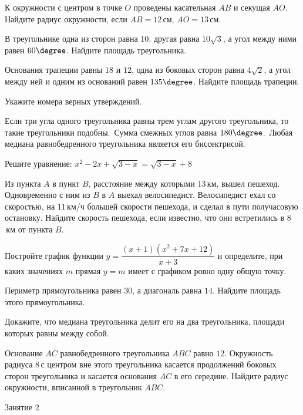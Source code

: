 \begin{class}[number=1]
\begin{listofex}
		\item К окружности с центром в точке \(O\) проведены касательная \(AB\) и секущая \(AO\). Найдите радиус окружности, если \(AB=12\) см, \(AO=13\) см.
		\item В треугольнике одна из сторон равна \(10\), другая равна \(10\sqrt{3}\), а угол между ними равен \(60\degree\). Найдите площадь треугольника.
		\item Основания трапеции равны \(18\) и \(12\), одна из боковых сторон равна \(4\sqrt{2}\), а угол между ней и одним из оснований равен \(135\degree\). Найдите площадь трапеции.
		\item Укажите номера верных утверждений.
		\begin{tasks}
			\task Если три угла одного треугольника равны трем углам другого треугольника, то такие треугольники подобны. 
			\task Сумма смежных углов равна \(180\degree\).
			\task Любая медиана равнобедренного треугольника является его биссектрисой.
		\end{tasks}
		\item Решите уравнение: \(x^2-2x+\sqrt{3-x}=\sqrt{3-x}+8\)
		\item Из пункта \(A\) в пункт \(B\), расстояние между которыми \(13\) км, вышел пешеход. Одновременно с ним из \(B\) в \(A\) выехал велосипедист. Велосипедист ехал со скоростью, на \(11\) км/ч большей скорости пешехода, и сделал в пути получасовую остановку. Найдите скорость пешехода, если известно, что они встретились в \(8\) км от пункта \(B\).
		\item Постройте график функции \(y=\dfrac{ (x+1)(x^2+7x+12) }{ x+3 }\) и определите, при каких значениях \(m\) прямая \(y=m\) имеет с графиком ровно одну общую точку.
		\item Периметр прямоугольника равен \(30\), а диагональ равна \(14\). Найдите площадь этого прямоугольника.
		\item Докажите, что медиана треугольника делит его на два треугольника, площади которых равны между собой.
		\item Основание \( AC \) равнобедренного треугольника \( ABC \) равно \( 12 \). Окружность радиуса \( 8 \) с центром вне этого треугольника касается продолжений боковых сторон треугольника и касается основания \( AC \) в его середине. Найдите радиус окружности, вписанной в треугольник \( ABC \).
	\end{listofex}
\end{class}

\begin{class}[number=2]
	\begin{listofex}
		\item Занятие 2
	\end{listofex}
\end{class}

